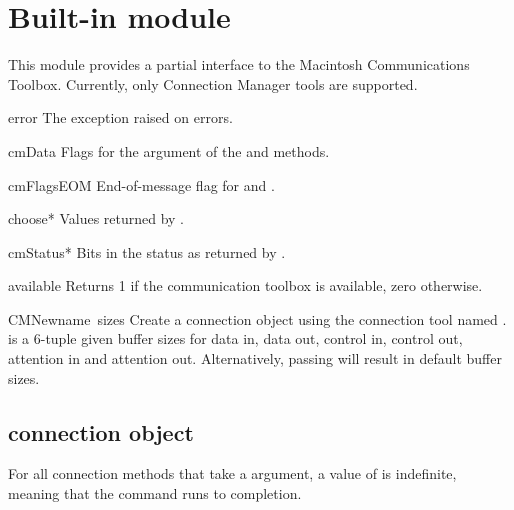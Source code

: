 \section{Built-in module }

This module provides a partial interface to the Macintosh
Communications Toolbox. Currently, only Connection Manager tools are
supported. 

\begin{datadesc}{error}
The exception raised on errors.
\end{datadesc}

\begin{datadesc}{cmData}
Flags for the  argument of the  and 
methods.
\end{datadesc}

\begin{datadesc}{cmFlagsEOM}
End-of-message flag for  and .
\end{datadesc}

\begin{datadesc}{choose*}
Values returned by .
\end{datadesc}

\begin{datadesc}{cmStatus*}
Bits in the status as returned by .
\end{datadesc}

\begin{funcdesc}{available}{}
Returns 1 if the communication toolbox is available, zero otherwise.
\end{funcdesc}

\begin{funcdesc}{CMNew}{name\, sizes}
Create a connection object using the connection tool named
.  is a 6-tuple given buffer sizes for data in,
data out, control in, control out, attention in and attention out.
Alternatively, passing  will result in default buffer sizes.
\end{funcdesc}

\subsection{connection object}
For all connection methods that take a  argument, a value
of  is indefinite, meaning that the command runs to completion.

\renewcommand{\indexsubitem}{(connection object method)}


